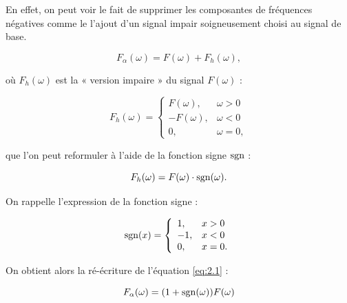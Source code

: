 En effet, on peut voir le fait de supprimer les composantes de fréquences négatives comme le l'ajout d'un signal impair soigneusement choisi au signal de base.

\begin{equation} \label{eq:2.1}
    F_{\alpha}(\omega) = F(\omega) + F_h(\omega),
\end{equation}

où $F_h(\omega)$ est la « version impaire » du signal $F(\omega)$ :

\begin{equation}
    F_h(\omega) = \left\{
    \begin{array}{ll}
        F(\omega), & \omega > 0 \\
        -F(\omega), & \omega < 0 \\
        0, & \omega = 0,
    \end{array}
    \right.
\end{equation}

que l'on peut reformuler à l'aide de la fonction signe $\operatorname{sgn}$ :

\begin{equation}
    F_h(\omega) = F(\omega)\cdot \operatorname{sgn}(\omega).
\end{equation}

On rappelle l'expression de la fonction signe :

\begin{equation}
    \operatorname{sgn}(x) = \left\{
    \begin{array}{ll}
        1, & x > 0 \\
        -1, & x < 0 \\
        0, & x = 0.
    \end{array}
    \right.
\end{equation}

On obtient alors la ré-écriture de l'équation \ref{eq:2.1} :

\begin{equation}
    F_{\alpha}(\omega) = (1+\operatorname{sgn}(\omega))F(\omega)
\end{equation}

